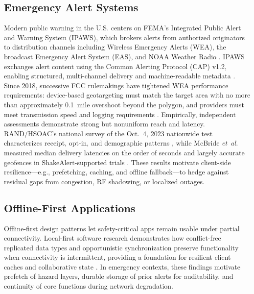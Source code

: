 \subsection{Emergency Alert Systems}
Modern public warning in the U.S. centers on FEMA's Integrated Public Alert and Warning System (IPAWS), which brokers alerts from authorized originators to distribution channels including Wireless Emergency Alerts (WEA), the broadcast Emergency Alert System (EAS), and NOAA Weather Radio \cite{nasem-2018-alerts}. IPAWS exchanges alert content using the Common Alerting Protocol (CAP) v1.2, enabling structured, multi-channel delivery and machine-readable metadata \cite{oasis-cap-1.2}. Since 2018, successive FCC rulemakings have tightened WEA performance requirements: device-based geo\-targeting must match the target area with no more than approximately 0.1~mile overshoot beyond the polygon, and providers must meet transmission speed and logging requirements \cite{fcc-2018-geo,fcc-wea-2023-doc}. Empirically, independent assessments demonstrate strong but nonuniform reach and latency. RAND/HSOAC's national survey of the Oct.\ 4, 2023 nationwide test characterizes receipt, opt-in, and demographic patterns \cite{rand-wea-2023-test}, while McBride \emph{et~al.} measured median delivery latencies on the order of seconds and largely accurate geofences in ShakeAlert-supported trials \cite{mcbride-2023-wea-latency}. These results motivate client-side resilience---e.g., prefetching, caching, and offline fallback---to hedge against residual gaps from congestion, RF shadowing, or localized outages.

\subsection{Offline-First Applications}
Offline-first design patterns let safety-critical apps remain usable under partial connectivity. Local-first software research demonstrates how conflict-free replicated data types and opportunistic synchronization preserve functionality when connectivity is intermittent, providing a foundation for resilient client caches and collaborative state \cite{kleppmann-2019-localfirst}. In emergency contexts, these findings motivate prefetch of hazard layers, durable storage of prior alerts for auditability, and continuity of core functions during network degradation.

